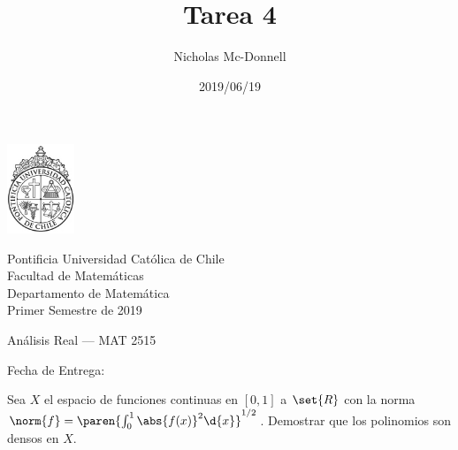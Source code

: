 

\title{Tarea 4}
\author{Nicholas Mc-Donnell}
\date{2019/06/19}



\begin{minipage}{2.5cm}
    \includegraphics[width=2cm]{../figures/logo1.jpg}
\end{minipage}
\begin{minipage}{13cm}
    \begin{flushleft}
        \raggedright{
            \noindent
            {\sc Pontificia Universidad Católica de Chile\\
                Facultad de Matemáticas\\
                Departamento de Matemática} \smallskip \\
            Primer Semestre de 2019\\
        }
    \end{flushleft}
\end{minipage}

\vspace{2ex}
{\Large \centerline{\bf \thetitle}}
{\large \centerline{Análisis Real --- MAT 2515}}
{\normalsize \centerline{ Fecha de Entrega: \thedate}}
\vfill

\begin{flushright}
    {\large\theauthor}
\end{flushright}
\newpage
\normalsize
{}
\tableofcontents
\newpage

\begin{prob}
    Sea \(X\) el espacio de funciones continuas en \([0,1]\) a \(\set{R}\) con la norma \(\norm{f}=\paren{\int_0^1\abs{f(x)}^2\d{x}}^{1/2}\). Demostrar que los polinomios son densos en \(X\).
\end{prob}

